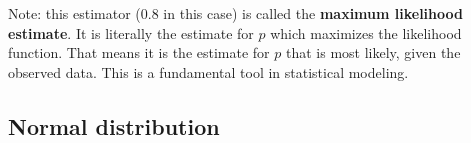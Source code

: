 \documentclass[11pt]{article}
\begin{document}
Note: this estimator (0.8 in this case) is called the \textbf{maximum likelihood estimate}.  It is literally the estimate for $p$ which maximizes the likelihood function.  That means it is the estimate for $p$ that is most likely, given the observed data.  This is a fundamental tool in statistical modeling.


\subsection*{Normal distribution}
\label{sec-3-2}
\end{document}
